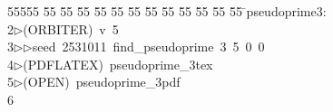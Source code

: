 %
%
\begin{tabbing}
55555 \= 55 \= 55 \= 55 \= 55 \= 55 \= 55 \= 55 \= 55 \= 55 \= 55 \= 55 \= 55 \= \>pseudoprime3:\\[0pt]
2\>$\triangleright$\>(ORBITER)\ v\ 5\ \\[0pt]
3\>$\triangleright$\>$\triangleright$\>seed\ 2531011\ find\_pseudoprime\ 3\ 5\ 0\ 0\ \\[0pt]
4\>$\triangleright$\>(PDFLATEX)\ pseudoprime\_3tex\\[0pt]
5\>$\triangleright$\>(OPEN)\ pseudoprime\_3pdf\\[0pt]
6\>\end{tabbing}
